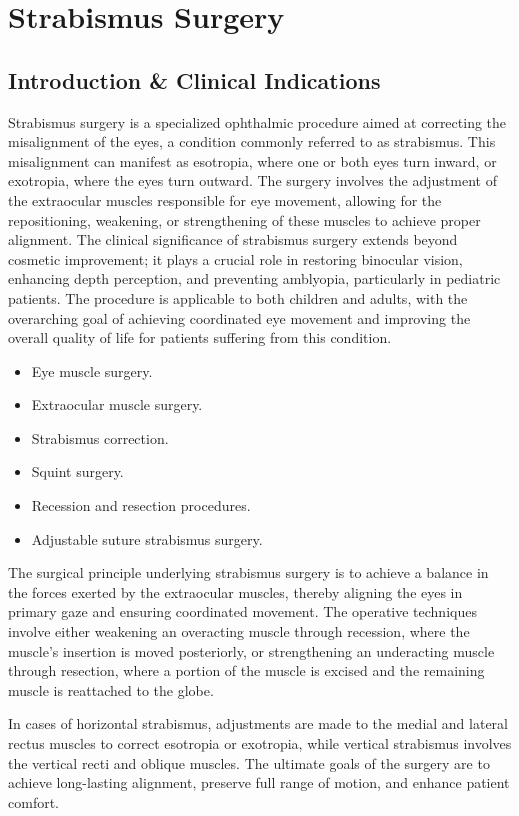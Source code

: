 \chapter{Strabismus Surgery}

\section*{Introduction \& Clinical Indications}
Strabismus surgery is a specialized ophthalmic procedure aimed at correcting the misalignment of the eyes, a condition commonly referred to as strabismus. This misalignment can manifest as esotropia, where one or both eyes turn inward, or exotropia, where the eyes turn outward. The surgery involves the adjustment of the extraocular muscles responsible for eye movement, allowing for the repositioning, weakening, or strengthening of these muscles to achieve proper alignment. The clinical significance of strabismus surgery extends beyond cosmetic improvement; it plays a crucial role in restoring binocular vision, enhancing depth perception, and preventing amblyopia, particularly in pediatric patients. The procedure is applicable to both children and adults, with the overarching goal of achieving coordinated eye movement and improving the overall quality of life for patients suffering from this condition.

\begin{itemize}
  \item Eye muscle surgery.
  \item Extraocular muscle surgery.
  \item Strabismus correction.
  \item Squint surgery.
  \item Recession and resection procedures.
  \item Adjustable suture strabismus surgery.
\end{itemize}

The surgical principle underlying strabismus surgery is to achieve a balance in the forces exerted by the extraocular muscles, thereby aligning the eyes in primary gaze and ensuring coordinated movement. The operative techniques involve either weakening an overacting muscle through recession, where the muscle's insertion is moved posteriorly, or strengthening an underacting muscle through resection, where a portion of the muscle is excised and the remaining muscle is reattached to the globe. 

In cases of horizontal strabismus, adjustments are made to the medial and lateral rectus muscles to correct esotropia or exotropia, while vertical strabismus involves the vertical recti and oblique muscles. The ultimate goals of the surgery are to achieve long-lasting alignment, preserve full range of motion, and enhance patient comfort.

